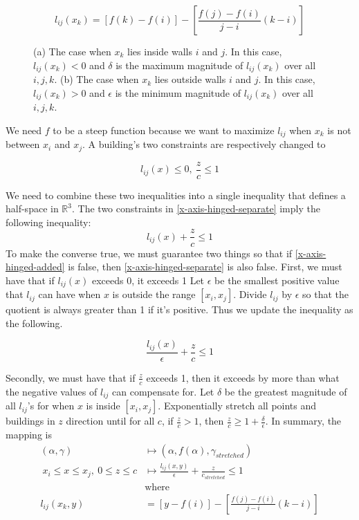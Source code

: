 \documentclass{NSF}
\begin{document}
\begin{equation*}
    l_{ij}(x_k) = [f(k) - f(i)] -[\frac{f(j)-f(i)}{j-i}(k - i)]
\end{equation*}


\begin{figure}[ht]
\caption{(a) The case when $x_k$ lies inside walls $i$ and $j$. In this case, $l_{ij}(x_k) < 0$ and $\delta$ is the maximum magnitude of $l_{ij}(x_k) $ over all $i,j,k$.  (b) The case when $x_k$ lies outside walls $i$ and $j$. In this case, $l_{ij}(x_k) > 0$ and $\epsilon$ is the minimum magnitude of $l_{ij}(x_k) $ over all $i,j,k$.}
\label{fig:buildings-graph}
\end{figure}

We need $f$ to be a steep function because we want to maximize $l_{ij}$ when $x_k$ is not between $x_i$ and $x_j$.
A building's two constraints are respectively changed to 

\begin{equation}\label{x-axis-hinged-separate}
    l_{ij}(x) \leq 0, \ \frac{z}{c} \leq 1
\end{equation}


We need to combine these two inequalities into a single inequality that defines a half-space in $\mathbb{R}^3$. 
The two constraints in \eqref{x-axis-hinged-separate} imply the following inequality:
\begin{equation}\label{x-axis-hinged-added}
    l_{ij}(x) + \frac{z}{c} \leq 1 
\end{equation}
To make the converse true, we must guarantee two things so that if \eqref{x-axis-hinged-added} is false, then \eqref{x-axis-hinged-separate} is also false. First, we must have that if $l_{ij}(x)$ exceeds 0, it exceeds 1  Let $\epsilon$ be the smallest positive value that $l_{ij}$ can have when $x$ is outside the range $[x_i,x_j]$. Divide  $l_{ij}$ by $\epsilon$ so that the quotient is always greater than 1 if it's positive. Thus we update the inequality as the following.

\begin{equation*}
	\frac{l_{ij}(x)}{\epsilon} + \frac{z}{c} \leq 1
\end{equation*}

Secondly, we must have that if $\frac{z}{c}$ exceeds 1, then it exceeds by more than what the negative values of  $l_{ij}$ can compensate for. Let $\delta$ be the greatest magnitude of all $l_{ij}$'s for when $x$ is inside $[x_i,x_j]$. Exponentially stretch all points and buildings in $z$ direction until for all $c$, if $\frac{z}{c} > 1$, then $\frac{z}{c} \geq 1+\frac{\delta}{\epsilon}$.  In summary, the mapping is
\begin{align*}
(\alpha,\gamma) & \mapsto (\alpha,f(\alpha),\gamma_{stretched}) \\
\ x_i \leq x \leq x_j,\ 0 \leq z \leq c & \mapsto \frac{l_{ij}(x,y)}{\epsilon} + \frac{z}{c_{stretched}} \leq 1 \\
& \text{where} \\
l_{ij}(x_k,y) & =  [y - f(i)] -[\frac{f(j)-f(i)}{j-i}(k - i)]
\end{align*}
\end{document}

